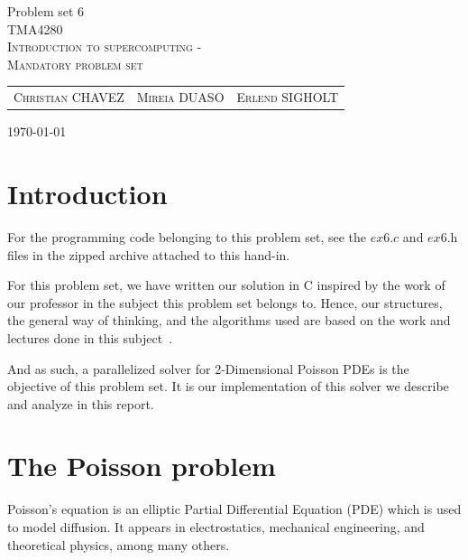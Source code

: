 \documentclass[fontsize=11pt,paper=a4,titlepage]{article}
\begin{document}
\begin{center}


{\huge Problem set 6}\\[0.5cm]

\textsc{\LARGE TMA4280}\\[0.5cm]
\textsc{\large Introduction to supercomputing -}\\
\textsc{\large Mandatory problem set}\\[0.6cm]

\begin{table}[h]
\centering
\begin{tabular}{ccc}
	\textsc{Christian CHAVEZ} & \textsc{Mireia DUASO} & \textsc{Erlend SIGHOLT}
\end{tabular}
\end{table}

\large{\today}
\vfill
\end{center}



\clearpage
\section{Introduction}

For the programming code belonging to this problem set, see the $\textit{ex6.c}$
and $\textit{ex6.h}$ files in the zipped archive attached to this hand-in.

For this problem set, we have written our solution in C inspired by the work of
our professor in the subject this problem set belongs to. Hence, our structures,
the general way of thinking, and the algorithms used are based on the work and
lectures done in this subject~\cite{tma4280}.

And as such, a parallelized solver for 2-Dimensional Poisson PDEs is the
objective of this problem set. It is our implementation of this solver we
describe and analyze in this report.


\section{The Poisson problem}
\label{sec:Pois-Prob}

Poisson's equation is an elliptic Partial Differential Equation (PDE) which is
used to model diffusion. It appears in electrostatics, mechanical
engineering, and theoretical physics, among many others.
\end{document}
